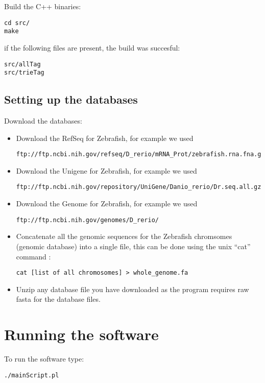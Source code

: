 \documentclass[a4paper,12pt]{article}
\begin{document}
Build the C++ binaries:
\small{
\begin{verbatim}
cd src/
make
\end{verbatim}
}

if the following files are present, the build was succesful: 
\small{
\begin{verbatim}
src/allTag
src/trieTag
\end{verbatim}
}

\subsection{Setting up the databases}
\label{sec:database}
Download the databases:

\begin{itemize}
\item Download the RefSeq for Zebrafish, for example we used 
\small{
\begin{verbatim}
ftp://ftp.ncbi.nih.gov/refseq/D_rerio/mRNA_Prot/zebrafish.rna.fna.gz
\end{verbatim}
}
\item Download the Unigene for Zebrafish, for example we used 
\small{
\begin{verbatim}
ftp://ftp.ncbi.nih.gov/repository/UniGene/Danio_rerio/Dr.seq.all.gz
\end{verbatim}
}

\item Download the Genome for Zebrafish, for example we used
\small{
\begin{verbatim}
ftp://ftp.ncbi.nih.gov/genomes/D_rerio/
\end{verbatim}
}
\item Concatenate all the genomic sequences for the Zebrafish chromsomes (genomic database) into a single file, this can be done using the unix ``cat'' command :
\small{
\begin{verbatim}
cat [list of all chromosomes] > whole_genome.fa
\end{verbatim}
}
\item Unzip any database file you have downloaded as the program requires raw fasta for the database files.
\end{itemize}


\section{Running the software}

To run the software type:
\small{
\begin{verbatim}
./mainScript.pl
\end{verbatim}
}
\end{document}
